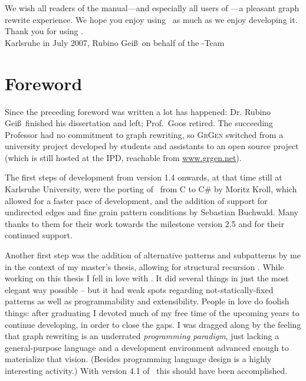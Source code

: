 We wish all readers of the manual---and especially all users of \GrG---a pleasant graph rewrite experience.
We hope you enjoy using \GrG\ as much as we enjoy developing it.\\[3ex]

Thank you for using \GrG.\\[6ex]

\noindent Karlsruhe in July 2007, Rubino Gei\ss~on behalf of the \GrG-Team

\pagebreak


\chapter*{Foreword}

Since the preceding foreword was written a lot has happened: Dr. Rubino Gei\ss~finished his dissertation \cite{DissRuby} and left; Prof.\ Goos retired.
The succeeding Professor had no commitment to graph rewriting,
so \textsc{GrGen} switched from a university project developed by students and assistants
to an open source project (which is still hosted at the IPD, reachable from \url{www.grgen.net}).

The first steps of development from version 1.4 onwards, at that time still at Karlsruhe University, were the porting of \GrG\ from C to C\# \cite{Kro:07} by Moritz Kroll, which allowed for a faster pace of development,
and the addition of support for undirected edges and fine grain pattern conditions \cite{SABuchwald:2008} by Sebastian Buchwald.
Many thanks to them for their work towards the milestone version 2.5 \cite{ExpressiveConvenientFast:2010} and for their continued support. 

Another first step was the addition of alternative patterns and subpatterns by me in the context of my master's thesis, allowing for structural recursion \cite{Jak:08,StructuralRecursion}. 
While working on this thesis I fell in love with \GrG.
It did several things in just the most elegant way possible -- but it had weak spots regarding not-statically-fixed patterns as well as programmability and extensibility.
People in love do foolish things: after graduating I devoted much of my free time of the upcoming years to continue developing, in order to close the gaps.
I was dragged along by the feeling that graph rewriting is an underrated \emph{programming paradigm}, just lacking a general-purpose language and a development environment advanced enough to materialize that vision. (Besides programming language design is a highly interesting activity.)
With version 4.1 of \GrG\ this should have been accomplished.\\[2ex]

